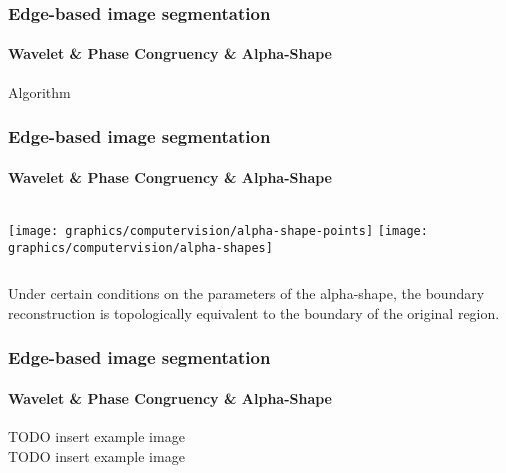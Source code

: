     \begin{frame}
        \frametitle{Edge-based image segmentation}
        \framesubtitle{Wavelet \& Phase Congruency \& Alpha-Shape}
            Algorithm
    \end{frame}

    \begin{frame}
        \frametitle{Edge-based image segmentation}
        \framesubtitle{Wavelet \& Phase Congruency \& Alpha-Shape}
        \begin{columns}[onlytextwidth]
                \texttt{[image: graphics/computervision/alpha-shape-points]}
                \texttt{[image: graphics/computervision/alpha-shapes]}
        \end{columns}
        \begin{description}
            \item<2-> \begin{theorem}
                            Under certain conditions on the parameters of the alpha-shape, the boundary reconstruction is topologically equivalent to the boundary of the original region.
                        \end{theorem}
        \end{description}
    \end{frame}

    \begin{frame}
        \frametitle{Edge-based image segmentation}
        \framesubtitle{Wavelet \& Phase Congruency \& Alpha-Shape}
        TODO insert example image\\
        TODO insert example image
    \end{frame}